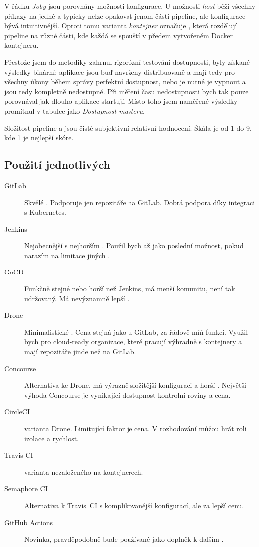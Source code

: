     V řádku \textit{Joby} jsou porovnány možnosti konfigurace. U možnosti \textit{host} běží všechny příkazy na jedné  a typicky nelze opakovat jenom části pipeline, ale konfigurace bývá intuitivnější. Oproti tomu varianta \textit{kontejner} označuje \CI, která rozdělují pipeline na různé části, kde každá se spouští v předem vytvořeném Docker kontejneru.

    Přestože jsem do metodiky zahrnul rigorózní testování dostupnosti, byly získané výsledky binární: aplikace jsou buď navrženy distribuovaně a mají tedy pro všechny úkony během správy perfektní dostupnost, nebo je nutné je vypnout a jsou tedy kompletně nedostupné. Při měření času nedostupnosti bych tak pouze porovnával jak dlouho aplikace startují. Místo toho jsem naměřené výsledky promítnul v tabulce jako \textit{Dostupnost masteru}.

    Složitost pipeline a  jsou čistě subjektivní relativní hodnocení. Škála je od 1 do 9, kde 1 je nejlepší skóre.

    \subsection{Použití jednotlivých \CI}
        \begin{description}
            \item[GitLab] Skvělé \CI. Podporuje jen repozitáře na GitLab. Dobrá podpora \CD díky integraci s Kubernetes.
            \item[Jenkins] Nejobecnější \CI s nejhorším . Použil bych až jako poslední možnost, pokud narazím na limitace jiných \CI.
            \item[GoCD] Funkčně stejné nebo horší než Jenkins, má menší komunitu, není tak udržovaný. Má nevýznamně lepší .
            \item[Drone] Minimalistické \CI. Cena stejná jako u GitLab, za řádově míň funkcí. Využil bych pro cloud-ready organizace, které pracují výhradně s kontejnery a mají repozitáře jinde než na GitLab.
            \item[Concourse] Alternativa ke Drone, má výrazně složitější konfiguraci a horší . Největši výhoda Concourse je vynikající dostupnost kontrolní roviny a cena.
            \item[CircleCI]  varianta Drone. Limitující faktor je cena. V rozhodování můžou hrát roli izolace a rychlost.
            \item[Travis CI]  varianta \CI nezaloženého na kontejnerech.
            \item[Semaphore CI] Alternativa k Travis~CI s komplikovanější konfigurací, ale za lepší cenu.
            \item[GitHub Actions] Novinka, pravděpodobně bude používané jako doplněk k dalším \CI.
        \end{description}

